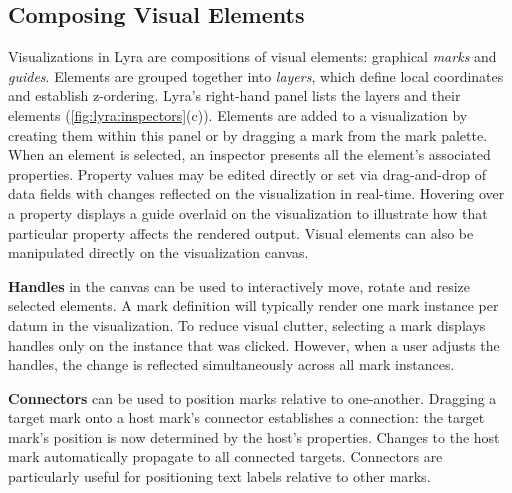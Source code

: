\subsection{Composing Visual Elements}

Visualizations in Lyra are compositions of visual elements: graphical
\emph{marks} and \emph{guides}. Elements are grouped together into
\emph{layers}, which define local coordinates and establish z-ordering. Lyra's
right-hand panel lists the layers and their elements
(\cref{fig:lyra:inspectors}(c)). Elements are added to a visualization by
creating them within this panel or by dragging a mark from the mark palette.
When an element is selected, an inspector presents all the element's associated
properties. Property values may be edited directly or set via drag-and-drop of
data fields with changes reflected on the visualization in real-time. Hovering
over a property displays a guide overlaid on the visualization to illustrate how
that particular property affects the rendered output. Visual elements can also
be manipulated directly on the visualization canvas.


\vspace{5pt}
\noindent
\textbf{Handles} in the canvas can be used to interactively move, rotate and
resize selected elements. A mark definition will typically render one mark
instance per datum in the visualization. To reduce visual clutter, selecting a
mark displays handles only on the instance that was clicked. However, when a
user adjusts the handles, the change is reflected simultaneously across all mark
instances.


\vspace{5pt}
\noindent
\textbf{Connectors} can be used to position marks relative to one-another.
Dragging a target mark onto a host mark's connector establishes a connection:
the target mark's position is now determined by the host's properties. Changes
to the host mark automatically propagate to all connected targets. Connectors
are particularly useful for positioning text labels relative to other marks.

